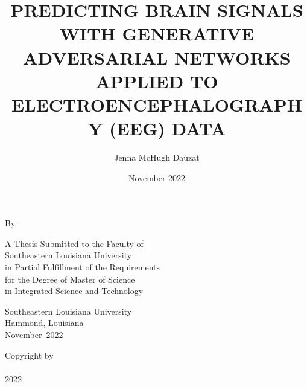 \documentclass[titlepage]{report}
\title{\MakeUppercase{Predicting Brain Signals with Generative Adversarial Networks Applied to Electroencephalography (EEG) Data}}
\author{Jenna McHugh Dauzat}
\date{November 2022}
\newcommand{\defensemonth}{November}
\newcommand{\defenseyear}{2022}
\newcommand{\college}{Science}
\newcommand{\department}{Integrated Science and Technology}
\newcommand{\institution}{Southeastern Louisiana University}
\newcommand{\location}{Hammond, Louisiana}
\begin{document}
	\begin{titlepage}
		\begin{center}
			\vspace*{2in}
			
			\thetitle
			
			\vspace{1.5cm}
			
			By
			
			\theauthor
			
			\vspace{0.8cm}
			
			A Thesis Submitted to the Faculty of\\
			\institution\\
			in Partial Fulfillment of the Requirements\\
			for the Degree of Master of \college\\
			in \department\\
			
			\vspace{0.8cm}
			
			\institution\\
			\location\\
	
			\vspace{1cm}
			\defensemonth \ \defenseyear
			
		\end{center}
	\end{titlepage}
	
	\begin{titlepage}
		\thispagestyle{plain}
		\begin{center}
			\vspace*{2in}
			Copyright by\\
			\theauthor\\
			\defenseyear\\
		\end{center}
	\end{titlepage}
	
\end{document}
